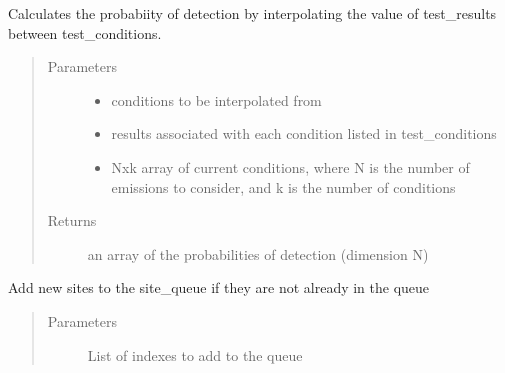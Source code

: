\documentclass[letterpaper,10pt,english]{sphinxmanual}
\begin{document}
\begin{fulllineitems}
\begin{fulllineitems}
\label{\detokenize{index:feast.DetectionModules.abstract_detection_method.DetectionMethod.empirical_interpolator}}
Calculates the probabiity of detection by interpolating the value of test\_results between test\_conditions.
\begin{quote}\begin{description}
\item[{Parameters}] \leavevmode\begin{itemize}
\item {} 
 \textendash{} conditions to be interpolated from

\item {} 
 \textendash{} results associated with each condition listed in test\_conditions

\item {} 
 \textendash{} Nxk array of current conditions, where N is the number of emissions to consider,
and k is the number of conditions

\end{itemize}

\item[{Returns}] \leavevmode
an array of the probabilities of detection (dimension N)

\end{description}\end{quote}

\end{fulllineitems}


\begin{fulllineitems}
\label{\detokenize{index:feast.DetectionModules.abstract_detection_method.DetectionMethod.extend_site_queue}}
Add new sites to the site\_queue if they are not already in the queue
\begin{quote}\begin{description}
\item[{Parameters}] \leavevmode
{} \textendash{} List of indexes to add to the queue


\end{description}
\end{quote}
\end{fulllineitems}
\end{fulllineitems}
\end{document}
